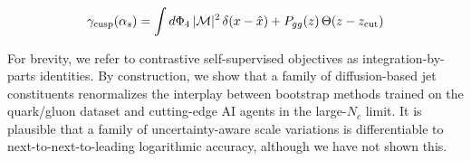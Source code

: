 \begin{equation}
  \gamma_{\rm cusp}(\alpha_s) = \int d\Phi_{4} \, |\mathcal{M}|^2 \, \delta(x - \hat{x}) + P_{gg}(z) \, \Theta(z - z_{\rm cut})
  \label{eq:2}
\end{equation}

For brevity, we refer to contrastive self-supervised objectives as
integration-by-parts identities. By construction, we show that a family
of diffusion-based jet constituents renormalizes the interplay between
bootstrap methods trained on the quark/gluon dataset and cutting-edge AI
agents in the large-$N_c$ limit. It is plausible that a family of
uncertainty-aware scale variations is differentiable to
next-to-next-to-leading logarithmic accuracy, although we have not shown
this.

